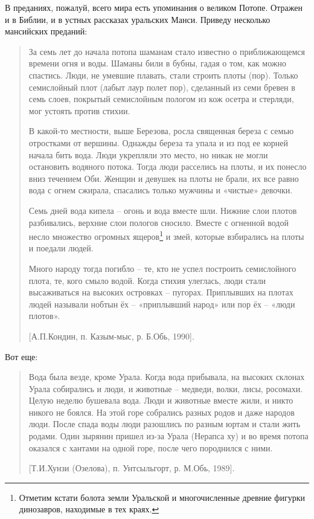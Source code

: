 В преданиях, пожалуй, всего мира есть упоминания о великом Потопе. Отражен и в Библии, и в устных рассказах уральских Манси. Приведу несколько мансийских преданий\cite{perevalova01}:

\begin{quotation}
За семь лет до начала потопа шаманам стало известно о приближающемся времени огня и воды. Шаманы били в бубны, гадая о том, как можно спастись. Люди, не умевшие плавать, стали строить плоты (пор). Только семислойный плот (лабыт лаур полет пор), сделанный из семи бревен в семь слоев, покрытый семислойным пологом из кож осетра и стерляди, мог устоять против стихии. 

В какой-то местности, выше Березова, росла священная береза с семью отростками от вершины. Однажды береза та упала и из под ее корней начала бить вода. Люди укрепляли это место, но никак не могли остановить водяного потока. Тогда люди расселись на плоты, и их понесло вниз течением Оби. Женщин и девушек на плоты не брали, их все равно вода с огнем сжирала, спасались только мужчины и «чистые» девочки. 

Семь дней вода кипела – огонь и вода вместе шли. Нижние слои плотов разбивались, верхние слои пологов сносило. Вместе с огненной водой несло множество огромных ящеров\footnote{Отметим кстати болота земли Уральской и многочисленные древние фигурки динозавров, находимые в тех краях.} и змей, которые взбирались на плоты и поедали людей. 

Много народу тогда погибло – те, кто не успел построить семислойного плота, те, кого смыло водой. Когда стихия улеглась, люди стали высаживаться на высоких островках – пугорах. Приплывших на плотах людей называли нобтын ёх – «приплывший народ» или пор ёх – «люди плотов».

[А.П.Кондин, п. Казым-мыс, р. Б.Обь, 1990].
\end{quotation}

Вот еще:

\begin{quotation}
Вода была везде, кроме Урала. Когда вода прибывала, на высоких склонах Урала собирались и люди, и животные – медведи, волки, лисы, росомахи. Целую неделю бушевала вода. Люди и животные вместе жили, и никто никого не боялся. На этой горе собрались разных родов и даже народов люди. После спада воды люди разошлись по разным юртам и стали жить родами. Один зырянин пришел из-за Урала (Нерапса ху) и во время потопа оказался с хантами на одной горе, после чего породнился с ними.

[Т.И.Хунзи (Озелова), п. Унтсыльгорт, р. М.Обь, 1989].
\end{quotation}

